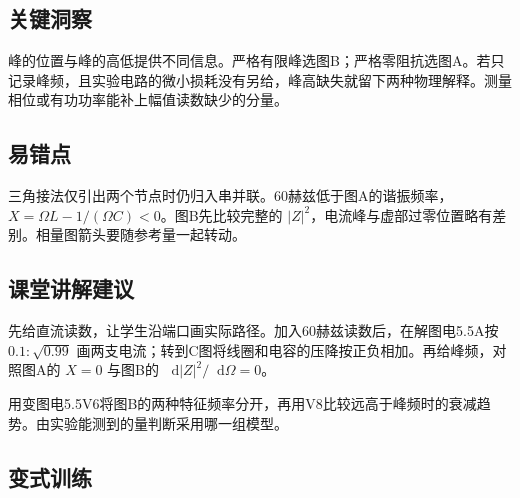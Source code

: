 \documentclass[UTF8,fontset=fandol,a4paper,11pt]{ctexart}
\newcommand{\dd}{\mathop{}\!\mathrm{d}}
\begin{document}


\subsection*{关键洞察}

峰的位置与峰的高低提供不同信息。严格有限峰选图B；严格零阻抗选图A。若只记录峰频，且实验电路的微小损耗没有另给，峰高缺失就留下两种物理解释。测量相位或有功功率能补上幅值读数缺少的分量。



\subsection*{易错点}

三角接法仅引出两个节点时仍归入串并联。60赫兹低于图A的谐振频率，$X=\Omega L-1/(\Omega C)<0$。图B先比较完整的 $|Z|^2$，电流峰与虚部过零位置略有差别。相量图箭头要随参考量一起转动。



\subsection*{课堂讲解建议}

先给直流读数，让学生沿端口画实际路径。加入60赫兹读数后，在解图电5.5A按 $0.1:\sqrt{0.99}$ 画两支电流；转到C图将线圈和电容的压降按正负相加。再给峰频，对照图A的 $X=0$ 与图B的 $\dd |Z|^2/\dd\Omega=0$。

用变图电5.5V6将图B的两种特征频率分开，再用V8比较远高于峰频时的衰减趋势。由实验能测到的量判断采用哪一组模型。


\subsection*{变式训练}
\end{document}
